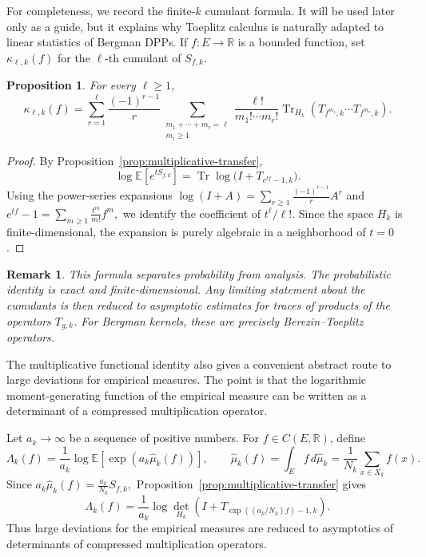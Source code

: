 \documentclass[12pt,a4paper,reqno]{article}
\theoremstyle{thmstyleone}
\newtheorem{proposition}[theorem]{Proposition}
\theoremstyle{thmstylethree}
\theoremstyle{thmstyletwo}
\newtheorem{remark}[theorem]{Remark}
\numberwithin{equation}{subsection}
\def\geq{\geqslant}
\begin{document}
For completeness, we record the finite-$k$ cumulant formula. It will be used later only as a guide, but it explains why Toeplitz calculus is naturally adapted to linear statistics of Bergman DPPs. If $f:E\to\mathbb R$ is a bounded function, set $\kappa_{\ell,k}(f)$ for the $\ell$-th cumulant of $S_{f,k}$.

\begin{proposition}\label{prop:cumulant-trace-formula}
For every $\ell\geq1$,
\[
    \kappa_{\ell,k}(f)
    =
    \sum_{r=1}^{\ell}
    \frac{(-1)^{r-1}}{r}
    \sum_{\substack{m_1+\cdots+m_r=\ell\\ m_i\geq1}}
    \frac{\ell!}{m_1!\cdots m_r!}
    \operatorname{Tr}_{H_k}
    \left(
        T_{f^{m_1},k}\cdots T_{f^{m_r},k}
    \right).
\]
\end{proposition}

\begin{proof}
By Proposition~\ref{prop:multiplicative-transfer},
\[
    \log\mathbb E[e^{tS_{f,k}}]
    =
    \operatorname{Tr}
    \log\big(I+T_{e^{tf}-1,k}\big).
\]
Using the power-series expansions $\log(I+A)=\sum_{r\geq1}\frac{(-1)^{r-1}}{r}A^r$ and $e^{tf}-1=\sum_{m\geq1}\frac{t^m}{m!}f^m,$ we identify the coefficient of $t^\ell/\ell!$. Since the space $H_k$ is finite-dimensional, the expansion is purely algebraic in a neighborhood of $t=0$.
\end{proof}

\begin{remark}
This formula separates probability from analysis. The probabilistic identity is exact and finite-dimensional. Any limiting statement about the cumulants is then reduced to asymptotic estimates for traces of products of the operators $T_{g,k}$. For Bergman kernels, these are precisely Berezin--Toeplitz operators.
\end{remark}

The multiplicative functional identity also gives a convenient abstract route to large deviations for empirical measures. The point is that the logarithmic moment-generating function of the empirical measure can be written as a determinant of a compressed multiplication operator.

Let $a_k\to\infty$ be a sequence of positive numbers. For $f\in C(E,\mathbb R)$, define
\[
\Lambda_k(f)
=
\frac{1}{a_k}
\log
\mathbb E
\left[
\exp\left(a_k\widehat\mu_k(f)\right)
\right],
\qquad
\widehat\mu_k(f)=\int_E f\,d\widehat\mu_k
=
\frac{1}{N_k}\sum_{x\in X_k}f(x).
\]
Since $a_k\widehat\mu_k(f)=\frac{a_k}{N_k}S_{f,k},$ Proposition~\ref{prop:multiplicative-transfer} gives
\[
\Lambda_k(f)
=
\frac{1}{a_k}
\log
\det_{H_k}
\left(
I+
T_{\exp((a_k/N_k)f)-1,k}
\right).
\]
Thus large deviations for the empirical measures are reduced to asymptotics of determinants of compressed multiplication operators.
\end{document}

